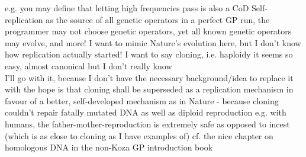 \documentclass{article}\usepackage[margin=2cm]{geometry}
\begin{document}
\begin{cascade}
    e.g. you may define that letting high frequencies pass is also a CoD
    \stepout
    \stepout
    \stepout
    Self-replication as the source of all genetic operators
    \stepin
    in a perfect GP run, the programmer may not choose genetic operators, yet all known genetic operators may evolve, and more!
    \stepin
    I want to mimic Nature's evolution here, but I don't know how replication actually started!
    \stepin
    I want to say cloning, i.e. haploidy
    \stepin
    it seems so easy, almost canonical
    \stepout
    but I don't really know\\
    I'll go with it, because I don't have the necessary background/idea to replace it with
    \stepout
    the hope is that cloning shall be superseded as a replication mechanism in favour of a better, self-developed mechanism
    \stepin
    as in Nature - because cloning couldn't repair fatally mutated DNA as well as diploid reproduction
    \stepin
    e.g. with humans, the father-mother-reproduction is extremely safe
    \stepin
    as opposed to incest (which is as close to cloning as I have examples of)
    \stepout
    cf. the nice chapter on homologous DNA in the non-Koza GP introduction book
    \stepout
\end{cascade}
\end{document}

